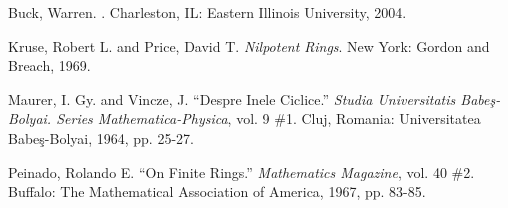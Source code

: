 \documentclass[12pt]{article}
\begin{document}
\begin{thebibliography}{9}
 Buck, Warren.  \emph{}.  Charleston, IL: Eastern Illinois University, 2004.

 Kruse, Robert L. and Price, David T.  \emph{Nilpotent Rings}.  New York: Gordon and Breach, 1969.

 Maurer, I. Gy. and Vincze, J.  ``Despre Inele Ciclice.''  \emph{Studia Universitatis Babe\c{s}-Bolyai.  Series Mathematica-Physica}, vol. 9 \#1.  Cluj, Romania: Universitatea Babe\c{s}-Bolyai, 1964, pp. 25-27.

 Peinado, Rolando E.  ``On Finite Rings.''  \emph{Mathematics Magazine}, vol. 40 \#2.  Buffalo: The Mathematical Association of America, 1967, pp. 83-85.
\end{thebibliography}
\end{document}
